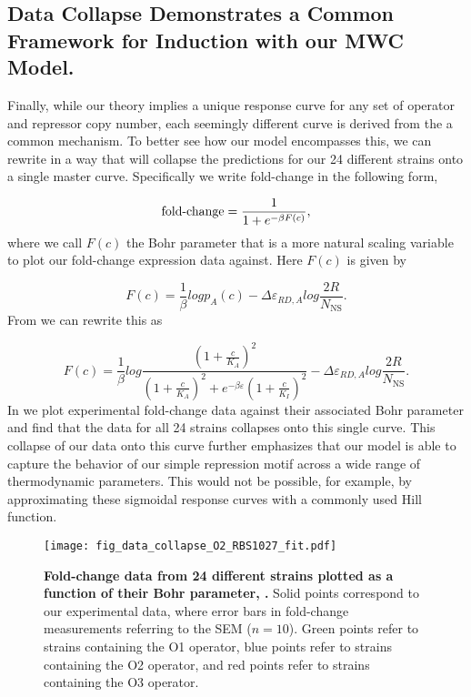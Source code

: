 \subsection*{Data Collapse Demonstrates a Common Framework for Induction with our MWC Model.}

Finally, while our theory implies a unique response curve for any set of operator and repressor copy number, each seemingly different curve is derived from the a common mechanism. To better see how our model encompasses this, we can rewrite \eref[eq7] in a way that will collapse the predictions for our 24 different strains onto a single master curve. Specifically we write fold-change in the following form,

\begin{equation}\label{eq8}
\operatorname{fold-change}= \frac{1}{1+e^{-\beta F(c)}} ,
\end{equation}
where we call $F(c)$ the Bohr parameter \cite{Phillips2016} that is a more natural scaling variable to plot our fold-change expression data against. Here $F(c)$ is given by

\begin{equation}\label{eq9}
F(c) =  \frac{1}{\beta} log p_A(c)
- \Delta\varepsilon_{RD,A}
log \frac{2R}{N_{\text{NS}}} .
\end{equation}
From \eref[eq7] we can rewrite this as

\begin{equation}\label{eq10}
F(c) = \frac{1}{\beta} log \frac{\left(1+\frac{c}{K_A}\right)^2}{\left(1+\frac{c}{K_A}\right)^2+e^{-\beta  \varepsilon }\left(1+\frac{c}{K_I}\right)^2} - \Delta\varepsilon_{RD,A} log \frac{2R}{N_{\text{NS}}} .
\end{equation}
In  we plot experimental fold-change data against their
associated Bohr parameter and find that the data for all 24 strains collapses onto this single curve. This collapse of our data onto this curve further emphasizes that our model is able to capture the behavior of our simple repression motif across a wide range of thermodynamic parameters. This would not be possible, for example, by approximating these sigmoidal response curves with a commonly used Hill function.

\begin{figure}[h]
	\centering \texttt{[image: fig\_data\_collapse\_O2\_RBS1027\_fit.pdf]}
	\caption{{\bf Fold-change data from 24 different strains plotted as a function of their Bohr parameter, \eref[eq10].}  Solid points correspond to our	experimental data, where error bars in fold-change measurements referring to the SEM ($n=10$). Green points refer to strains containing the O1 operator, blue points refer to strains containing the O2 operator, and red points refer	to strains containing the O3 operator.
		} \label{fig_result3}
\end{figure}
